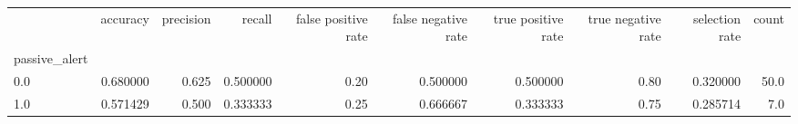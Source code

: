 \begin{tabular}{lrrrrrrrrr}
\toprule
{} &  accuracy &  precision &    recall &  false positive rate &  false negative rate &  true positive rate &  true negative rate &  selection rate &  count \\
passive\_alert &           &            &           &                      &                      &                     &                     &                 &        \\
\midrule
0.0           &  0.680000 &      0.625 &  0.500000 &                 0.20 &             0.500000 &            0.500000 &                0.80 &        0.320000 &   50.0 \\
1.0           &  0.571429 &      0.500 &  0.333333 &                 0.25 &             0.666667 &            0.333333 &                0.75 &        0.285714 &    7.0 \\
\bottomrule
\end{tabular}
